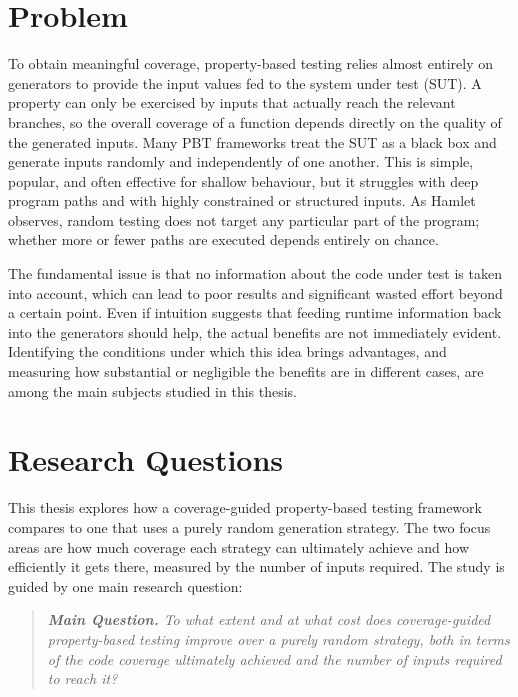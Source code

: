 \documentclass[11pt,a4paper]{report}
\begin{document}
\section{Problem}
\label{sec:problem}

To obtain meaningful coverage, property-based testing relies almost entirely on generators to provide the
input values fed to the system under test (SUT). A property can only be exercised by inputs that actually
reach the relevant branches, so the overall coverage of a function depends directly on the quality of the
generated inputs. Many PBT frameworks treat the SUT as a black box and generate inputs randomly and
independently of one another. This is simple, popular, and often effective for shallow behaviour, but it
struggles with deep program paths and with highly constrained or structured inputs. As Hamlet~\cite{hamlet}
observes, random testing does not target any particular part of the program; whether more or fewer paths
are executed depends entirely on chance.

The fundamental issue is that no information about the code under test is taken into account, which can
lead to poor results and significant wasted effort beyond a certain point. Even if intuition suggests that
feeding runtime information back into the generators should help, the actual benefits are not immediately
evident. Identifying the conditions under which this idea brings advantages, and measuring how substantial
or negligible the benefits are in different cases, are among the main subjects studied in this thesis.

\section{Research Questions}
\label{sec:rq}

This thesis explores how a coverage-guided property-based testing framework compares to one that uses a
purely random generation strategy. The two focus areas are how much coverage each strategy can ultimately
achieve and how efficiently it gets there, measured by the number of inputs required. The study is guided
by one main research question:

\begin{quote}\itshape
\textbf{Main Question.} To what extent and at what cost does coverage-guided property-based testing improve
over a purely random strategy, both in terms of the code coverage ultimately achieved and the number of
inputs required to reach it?
\end{quote}
\end{document}
